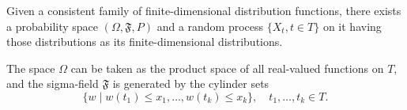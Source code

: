 Given a consistent family of finite-dimensional distribution functions, there exists a probability space $(\Omega, \mathfrak{F}, P)$ and a random process $\{X_t, t \in T\}$ on it having those distributions as its finite-dimensional distributions.

The space $\Omega$ can be taken as the product space of all real-valued functions on $T$, and the sigma-field $\mathfrak{F}$ is generated by the cylinder sets
$$\{w \mid w(t_1) \leq x_1, \ldots, w(t_k) \leq x_k\}, \quad t_1, \ldots, t_k \in T.$$
